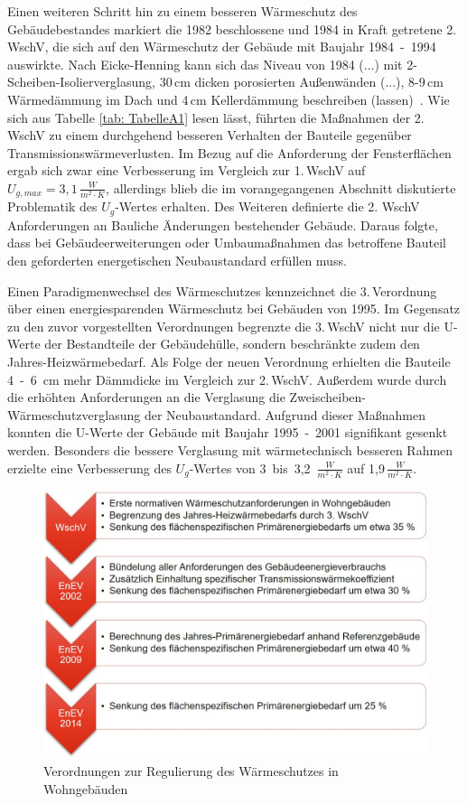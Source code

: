 Einen weiteren Schritt hin zu einem besseren Wärmeschutz des Gebäudebestandes markiert die 1982 beschlossene und 1984 in Kraft getretene 2. WschV, die sich auf den Wärmeschutz der Gebäude mit Baujahr \mbox{1984 - 1994} auswirkte.
Nach Eicke-Henning kann sich \glqq das Niveau von 1984 (...) mit 2-Scheiben-Isolierverglasung, 30\,cm dicken porosierten Außenwänden (...), 8-9\,cm Wärmedämmung im Dach und 4\,cm Kellerdämmung beschreiben (lassen) \grqq\,\cite{EickeHenning.2011}.
Wie sich aus Tabelle \ref{tab: TabelleA1} lesen lässt, führten die Maßnahmen der 2.\,WschV zu einem durchgehend besseren Verhalten der Bauteile gegenüber Transmissionswärmeverlusten. 
Im Bezug auf die Anforderung der Fensterflächen ergab sich zwar eine Verbesserung im Vergleich zur 1.\,WschV auf \(U_{g, max} = 3,1\,\frac{W}{m^2 \cdot K} \), allerdings blieb die im vorangegangenen Abschnitt diskutierte Problematik des \(U_g\)-Wertes erhalten.
Des Weiteren definierte die 2. WschV Anforderungen an \glqq Bauliche Änderungen bestehender Gebäude\grqq.
Daraus folgte, dass bei Gebäudeerweiterungen oder Umbaumaßnahmen das betroffene Bauteil den geforderten energetischen Neubaustandard erfüllen muss.

Einen Paradigmenwechsel des Wärmeschutzes kennzeichnet die 3.\,Verordnung über einen energiesparenden Wärmeschutz bei Gebäuden von 1995.
Im Gegensatz zu den zuvor vorgestellten Verordnungen begrenzte die 3.\,WschV nicht nur die U-Werte der Bestandteile der Gebäudehülle, sondern beschränkte zudem den Jahres-Heizwärmebedarf.
Als Folge der neuen Verordnung erhielten die Bauteile \mbox{4 - 6 cm} mehr Dämmdicke im Vergleich zur 2.\,WschV. 
Außerdem wurde durch die erhöhten Anforderungen an die Verglasung die Zweischeiben-Wärmeschutzverglasung der Neubaustandard.
Aufgrund dieser Maßnahmen konnten die U-Werte der Gebäude mit Baujahr \mbox{1995 - 2001} signifikant gesenkt werden.
Besonders die bessere Verglasung mit wärmetechnisch besseren Rahmen erzielte eine Verbesserung des \(U_g\)-Wertes von \mbox{3 bis 3,2 \(\frac{W}{m^2 \cdot K} \)} auf 1,9\,\(\frac{W}{m^2 \cdot K}\).

\begin{figure}[H]
	\centering
		\includegraphics{Pictures/ZeitstrahlGesetze.jpg}
	\caption{Verordnungen zur Regulierung des Wärmeschutzes in Wohngebäuden \cite{Heikrodt.2014}}
	\label{fig: Abbildung222} 
\end{figure}

